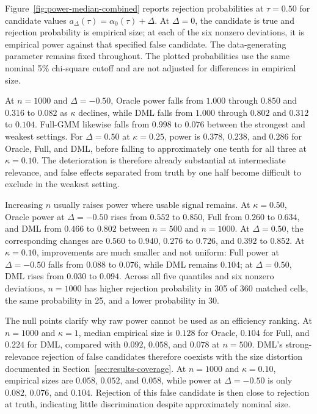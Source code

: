 Figure~\ref{fig:power-median-combined} reports rejection probabilities at $\tau=0.50$ for candidate values $a_{\Delta}(\tau)=\alpha_0(\tau)+\Delta$. At $\Delta=0$, the candidate is true and rejection probability is empirical size; at each of the six nonzero deviations, it is empirical power against that specified false candidate. The data-generating parameter remains fixed throughout. The plotted probabilities use the same nominal 5\% chi-square cutoff and are not adjusted for differences in empirical size.



At $n=1000$ and $\Delta=-0.50$, Oracle power falls from $1.000$ through $0.850$ and $0.316$ to $0.082$ as $\kappa$ declines, while DML falls from $1.000$ through $0.802$ and $0.312$ to $0.104$. Full-GMM likewise falls from $0.998$ to $0.076$ between the strongest and weakest settings. For $\Delta=0.50$ at $\kappa=0.25$, power is $0.378$, $0.238$, and $0.286$ for Oracle, Full, and DML, before falling to approximately one tenth for all three at $\kappa=0.10$. The deterioration is therefore already substantial at intermediate relevance, and false effects separated from truth by one half become difficult to exclude in the weakest setting.

Increasing $n$ usually raises power where usable signal remains. At $\kappa=0.50$, Oracle power at $\Delta=-0.50$ rises from $0.552$ to $0.850$, Full from $0.260$ to $0.634$, and DML from $0.466$ to $0.802$ between $n=500$ and $n=1000$. At $\Delta=0.50$, the corresponding changes are $0.560$ to $0.940$, $0.276$ to $0.726$, and $0.392$ to $0.852$. At $\kappa=0.10$, improvements are much smaller and not uniform: Full power at $\Delta=-0.50$ falls from $0.088$ to $0.076$, while DML remains $0.104$; at $\Delta=0.50$, DML rises from $0.030$ to $0.094$. Across all five quantiles and six nonzero deviations, $n=1000$ has higher rejection probability in 305 of 360 matched cells, the same probability in 25, and a lower probability in 30.

The null points clarify why raw power cannot be used as an efficiency ranking. At $n=1000$ and $\kappa=1$, median empirical size is $0.128$ for Oracle, $0.104$ for Full, and $0.224$ for DML, compared with $0.092$, $0.058$, and $0.078$ at $n=500$. DML's strong-relevance rejection of false candidates therefore coexists with the size distortion documented in Section~\ref{sec:results-coverage}. At $n=1000$ and $\kappa=0.10$, empirical sizes are $0.058$, $0.052$, and $0.058$, while power at $\Delta=-0.50$ is only $0.082$, $0.076$, and $0.104$. Rejection of this false candidate is then close to rejection at truth, indicating little discrimination despite approximately nominal size.

